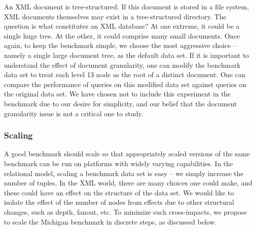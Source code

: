 An XML document is tree-structured.  If this document is stored in a
file system, XML documents themselves may exist in a tree-structured
directory. The question is what constitutes an XML database?  At one
extreme, it could be a single huge tree.  At the other, it could
comprise many small documents.   Once again, to keep the benchmark simple, we choose the most
aggressive choice -- namely a single large document tree, as the
default data set.  If it is important to understand the effect of
document granularity, one can modify the benchmark data set to treat
each level 13 node as the root of a distinct document.  One can
compare the performance of queries on this modified data set against
queries on the original data set.  We have chosen not to include this
experiment in the benchmark due to our desire for simplicity, and our
belief that the document granularity issue is not a critical one to
study.


\subsubsection{Scaling}
A good benchmark should scale so that appropriately scaled versions of
the same benchmark can be run on platforms with widely varying
capabilities.  In the relational model, scaling a benchmark data set
is easy -- we simply increase the number of tuples.  In the XML world,
there are many choices one could make, and these could have an effect
on the structure of the data set.  We would like to isolate the effect
of the number of nodes from effects due to other structural changes,
such as depth, fanout, etc.  To minimize such cross-impacts, we
propose to scale the Michigan benchmark in discrete steps, as
discussed below.

